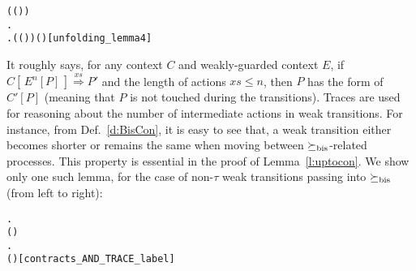 {\begin{alltt}
\begin{small}
\HOLTokenTurnstile{}   \HOLSymConst{\HOLTokenConj{}}   \HOLSymConst{\HOLTokenConj{}}  (( \HOLSymConst{\HOLTokenCompose}   ) )   \HOLSymConst{\HOLTokenConj{}}
     \HOLSymConst{\HOLTokenLeq{}}  \HOLSymConst{\HOLTokenImp{}}
   \HOLSymConst{\HOLTokenExists{}}.
         \HOLSymConst{\HOLTokenConj{}}  \HOLSymConst{=}   \HOLSymConst{\HOLTokenConj{}}
       \HOLSymConst{\HOLTokenForall{}}.  (( \HOLSymConst{\HOLTokenCompose}   ) )  ( )\hfill{[unfolding_lemma4]}
\end{small}
\end{alltt}

It roughly says, for any context $C$ and weakly-guarded context
$E$, if $C [\, E^n[P]\,] \overset{xs}{\Longrightarrow} P'$ and the length
of actions $xs \leqslant n$, then $P$ has the form of $C'[P]$ (meaning
that $P$ is not touched during the transitions). Traces are used for
reasoning about the number of intermediate actions in weak
transitions. For instance, from Def.~\ref{d:BisCon}, it is easy
to see that, a weak transition either becomes shorter
or remains the same when moving between $\mathrel{\succeq_{\rm{bis}}}$-related processes.
This property is essential in the proof of
Lemma~\ref{l:uptocon}. We show only one such lemma, for the case of
non-$\tau$ weak transitions passing into $\mathrel{\succeq_{\rm{bis}}}$ (from left to right):
\begin{alltt}
\HOLTokenTurnstile{}  \HOLSymConst{\HOLTokenContracts{}}  \HOLSymConst{\HOLTokenImp{}}
   \HOLSymConst{\HOLTokenForall{}}  .
           \HOLSymConst{\HOLTokenConj{}}  ( )  \HOLSymConst{\HOLTokenImp{}}
       \HOLSymConst{\HOLTokenExists{}} .
               \HOLSymConst{\HOLTokenConj{}}  \HOLSymConst{\HOLTokenContracts{}}  \HOLSymConst{\HOLTokenConj{}}   \HOLSymConst{\HOLTokenLeq{}}   \HOLSymConst{\HOLTokenConj{}}
            ( ) \hfill{[contracts_AND_TRACE_label]}
\end{alltt}

}
